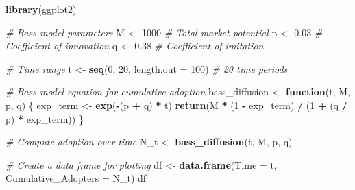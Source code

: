 \documentclass[
]{article}
\author{}
\date{\vspace{-2.5em}}
\newenvironment{Shaded}{\begin{snugshade}}{\end{snugshade}}
\newcommand{\AttributeTok}[1]{\textcolor[rgb]{0.13,0.29,0.53}{#1}}
\newcommand{\CommentTok}[1]{\textcolor[rgb]{0.56,0.35,0.01}{\textit{#1}}}
\newcommand{\ControlFlowTok}[1]{\textcolor[rgb]{0.13,0.29,0.53}{\textbf{#1}}}
\newcommand{\DecValTok}[1]{\textcolor[rgb]{0.00,0.00,0.81}{#1}}
\newcommand{\FloatTok}[1]{\textcolor[rgb]{0.00,0.00,0.81}{#1}}
\newcommand{\FunctionTok}[1]{\textcolor[rgb]{0.13,0.29,0.53}{\textbf{#1}}}
\newcommand{\NormalTok}[1]{#1}
\newcommand{\OtherTok}[1]{\textcolor[rgb]{0.56,0.35,0.01}{#1}}
\newcommand{\SpecialCharTok}[1]{\textcolor[rgb]{0.81,0.36,0.00}{\textbf{#1}}}
\begin{document}
\begin{Shaded}
\begin{Highlighting}[]
\FunctionTok{library}\NormalTok{(ggplot2)}

\CommentTok{\# Bass model parameters}
\NormalTok{M }\OtherTok{\textless{}{-}} \DecValTok{1000}  \CommentTok{\# Total market potential}
\NormalTok{p }\OtherTok{\textless{}{-}} \FloatTok{0.03}  \CommentTok{\# Coefficient of innovation}
\NormalTok{q }\OtherTok{\textless{}{-}} \FloatTok{0.38}  \CommentTok{\# Coefficient of imitation}

\CommentTok{\# Time range}
\NormalTok{t }\OtherTok{\textless{}{-}} \FunctionTok{seq}\NormalTok{(}\DecValTok{0}\NormalTok{, }\DecValTok{20}\NormalTok{, }\AttributeTok{length.out =} \DecValTok{100}\NormalTok{)  }\CommentTok{\# 20 time periods}
\end{Highlighting}
\end{Shaded}

\begin{Shaded}
\begin{Highlighting}[]
\CommentTok{\# Bass model equation for cumulative adoption}
\NormalTok{bass\_diffusion }\OtherTok{\textless{}{-}} \ControlFlowTok{function}\NormalTok{(t, M, p, q) \{}
\NormalTok{  exp\_term }\OtherTok{\textless{}{-}} \FunctionTok{exp}\NormalTok{(}\SpecialCharTok{{-}}\NormalTok{(p }\SpecialCharTok{+}\NormalTok{ q) }\SpecialCharTok{*}\NormalTok{ t)}
  \FunctionTok{return}\NormalTok{(M }\SpecialCharTok{*}\NormalTok{ (}\DecValTok{1} \SpecialCharTok{{-}}\NormalTok{ exp\_term) }\SpecialCharTok{/}\NormalTok{ (}\DecValTok{1} \SpecialCharTok{+}\NormalTok{ (q }\SpecialCharTok{/}\NormalTok{ p) }\SpecialCharTok{*}\NormalTok{ exp\_term))}
\NormalTok{\}}

\CommentTok{\# Compute adoption over time}
\NormalTok{N\_t }\OtherTok{\textless{}{-}} \FunctionTok{bass\_diffusion}\NormalTok{(t, M, p, q)}

\CommentTok{\# Create a data frame for plotting}
\NormalTok{df }\OtherTok{\textless{}{-}} \FunctionTok{data.frame}\NormalTok{(}\AttributeTok{Time =}\NormalTok{ t, }\AttributeTok{Cumulative\_Adopters =}\NormalTok{ N\_t)}
\NormalTok{df}
\end{Highlighting}
\end{Shaded}
\end{document}
